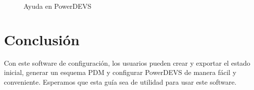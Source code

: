 \documentclass[]{article}
\begin{document}
    \begin{figure}[H]
    \centering
    \caption{Ayuda en PowerDEVS}
    \label{fig:ayuda}
    \end{figure}
    
    \section{Conclusión}
    
    Con este software de configuración, los usuarios pueden crear y exportar el estado inicial, generar un esquema PDM y configurar PowerDEVS de manera fácil y conveniente. Esperamos que esta guía sea de utilidad para usar este software.
    
    
\end{document}

